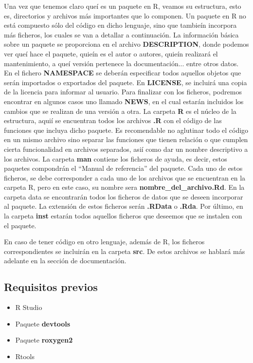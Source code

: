 Una vez que tenemos claro que\'i es un paquete en R, veamos su estructura, esto es, directorios y archivos 
m\'as importantes que lo componen.
Un paquete en R no est\'a compuesto s\'olo del c\'odigo en dicho lenguaje, sino que tambie\'in incorpora m\'as ficheros, 
los cuales se van a detallar a continuaci\'on.
La informaci\'on b\'asica sobre un paquete se proporciona en el archivo \textbf{\textbf{DESCRIPTION}}, donde podemos ver que\'i hace 
el paquete, quie\'in es el autor o autores, quie\'in realizar\'a el mantenimiento, a que\'i versi\'on pertenece la 
documentaci\'on... entre otros datos.
En el fichero \textbf{NAMESPACE} se deber\'an especificar todos aquellos objetos que ser\'an importados o exportados del paquete.
En \textbf{LICENSE}, se incluir\'a una copia de la licencia para informar al usuario.
Para finalizar con los ficheros, podremos encontrar en algunos casos uno llamado \textbf{NEWS}, en el cual estar\'an 
incluidos los cambios que se realizan de una versi\'on a otra.
La carpeta \textbf{R} es el n\'ucleo de la estructura, aqui\'i se encuentran todos los archivos \textbf{\textbf{.R}} con el c\'odigo de las 
funciones que incluya dicho paquete.
Es recomendable no aglutinar todo el c\'odigo en un mismo archivo sino separar las funciones que tienen relaci\'on 
o que cumplen cierta funcionalidad en archivos separados, asi\'i como dar un nombre descriptivo a los archivos.
La carpeta \textbf{man} contiene los ficheros de ayuda, es decir, estos paquetes compondr\'an el “Manual de referencia” 
del paquete. Cada uno de estos ficheros, se debe corresponder a cada uno de los archivos que se encuentran 
en la carpeta R, pero en este caso, su nombre sera \textbf{nombre\_del\_archivo\textbf{.R}d}.
En la carpeta data se encontrar\'an todos los ficheros de datos que se deseen incorporar al paquete. La extensi\'on 
de estos ficheros ser\'an \textbf{\textbf{.R}Data} o \textbf{\textbf{.R}da}.
Por \'ultimo, en la carpeta \textbf{inst} estar\'an todos aquellos ficheros que deseemos que se instalen con el paquete.


En caso de tener c\'odigo en otro lenguaje, adem\'as de R, los ficheros correspondientes se incluir\'an en la carpeta 
\textbf{src}.
De estos archivos se hablar\'a m\'as adelante en la secci\'on de documentaci\'on.


\subsection{Requisitos previos}

\begin{itemize}
    \item R Studio
    \item Paquete \textbf{devtools}
    \item Paquete \textbf{\textbf{roxygen2}} 
    \item Rtools
\end{itemize}

